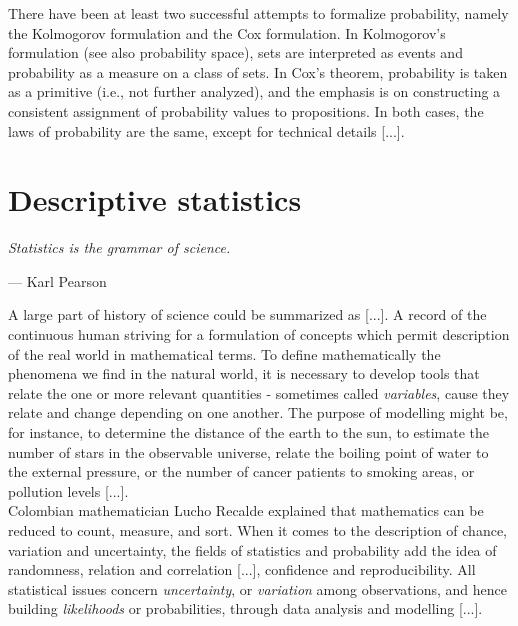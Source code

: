 \documentclass{book}
\begin{document}
\medskip

There have been at least two successful attempts to formalize probability, namely the Kolmogorov formulation and the Cox formulation. In Kolmogorov's formulation (see also probability space), sets are interpreted as events and probability as a measure on a class of sets. In Cox's theorem, probability is taken as a primitive (i.e., not further analyzed), and the emphasis is on constructing a consistent assignment of probability values to propositions. In both cases, the laws of probability are the same, except for technical details [...].\\



\chapter{Descriptive statistics}

\epigraph{\textit{Statistics is the grammar of science.}}{— Karl Pearson}
 
 A large part of history of science could be summarized as [...]. A record of the continuous human striving for a formulation of concepts which permit description of the real world in mathematical terms. To define mathematically the phenomena we find in the natural world, it is necessary to develop tools that relate the one or more relevant quantities - sometimes called \textit{variables}, cause they relate and change depending on one another. The purpose of modelling might be, for instance, to determine the distance of the earth to the sun, to estimate the number of stars in the observable universe, relate the boiling point of water to the external pressure, or the number of cancer patients to smoking areas, or pollution levels [...].\\
 
Colombian mathematician Lucho Recalde explained that mathematics can be reduced to count, measure, and sort. When it comes to the description of chance, variation and uncertainty, the fields of statistics and probability add the idea of randomness, relation and correlation [...], confidence and reproducibility. All statistical issues concern \textit{uncertainty}, or \textit{variation} among observations, and hence building \textit{likelihoods} or probabilities, through data analysis and modelling [...].
\end{document}
